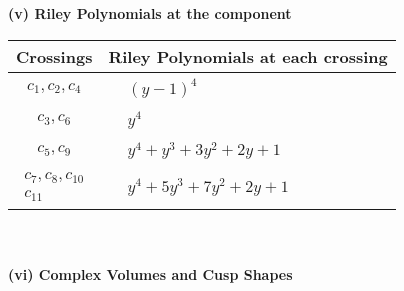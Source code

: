 \documentclass[1p]{elsarticle_modified}
\theoremstyle{definition}
\begin{document}
\newpage\renewcommand{\arraystretch}{1}
\flushleft \textbf{(v) Riley Polynomials at the component}\newline \\
\begin{tabular}{m{50pt}|m{274pt}}
Crossings & \hspace{64pt}Riley Polynomials at each crossing \\
\hline $$\begin{aligned}c_{1},c_{2},c_{4}\end{aligned}$$&$\begin{aligned}
&(y-1)^4
\end{aligned}$\\
\hline $$\begin{aligned}c_{3},c_{6}\end{aligned}$$&$\begin{aligned}
&y^4
\end{aligned}$\\
\hline $$\begin{aligned}c_{5},c_{9}\end{aligned}$$&$\begin{aligned}
&y^4+y^3+3 y^2+2 y+1
\end{aligned}$\\
\hline $$\begin{aligned}c_{7},c_{8},c_{10}\\c_{11}\end{aligned}$$&$\begin{aligned}
&y^4+5 y^3+7 y^2+2 y+1
\end{aligned}$\\
\hline
\end{tabular}\\~\\
\newpage\flushleft \textbf{(vi) Complex Volumes and Cusp Shapes}
\end{document}
